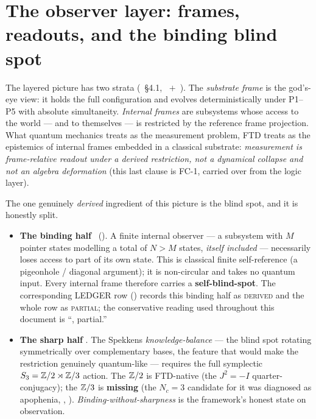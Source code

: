 \section{The observer layer: frames, readouts, and the binding blind spot}
\label{sec:phil-observer}

The layered picture has two strata
(~\S4.1, ~$+$~). The \emph{substrate frame} is
the god's-eye view: it holds the full configuration and evolves deterministically
under P1--P5 with absolute simultaneity. \emph{Internal frames} are subsystems
whose access to the world --- and to themselves --- is restricted by the
reference frame projection. What quantum mechanics treats as the measurement
problem, FTD treats as the epistemics of internal frames embedded in a classical
substrate: \emph{measurement is frame-relative readout under a derived
restriction, not a dynamical collapse and not an algebra deformation} (this last
clause is FC-1, carried over from the logic layer).

The one genuinely \emph{derived} ingredient of this picture is the blind spot,
and it is honestly split.

\begin{itemize}[leftmargin=1.4em,itemsep=3pt,topsep=2pt]
  \item \textbf{The binding half} ~(). A finite
    internal observer --- a subsystem with $M$ pointer states modelling a total
    of $N > M$ states, \emph{itself included} --- necessarily loses access to
    part of its own state. This is classical finite self-reference (a
    pigeonhole / diagonal argument); it is non-circular and takes no quantum
    input. Every internal frame therefore carries a \textbf{self-blind-spot}.
    The corresponding LEDGER row () records this binding half as
    \textsc{derived} and the whole row as \textsc{partial}; the conservative
    reading used throughout this document is ``, partial.''
  \item \textbf{The sharp half} . The Spekkens \emph{knowledge-balance}
    --- the blind spot rotating symmetrically over complementary bases, the
    feature that would make the restriction genuinely quantum-like --- requires
    the full symplectic $S_3 = \mathbb{Z}/2 \rtimes \mathbb{Z}/3$ action. The $\mathbb{Z}/2$ is
    FTD-native (the $J^2 = -I$ quarter-conjugacy); the $\mathbb{Z}/3$ is
    \textbf{missing} (the $N_c = 3$ candidate for it was diagnosed as apophenia,
    , ). \emph{Binding-without-sharpness} is the framework's
    honest state on observation.
\end{itemize}


